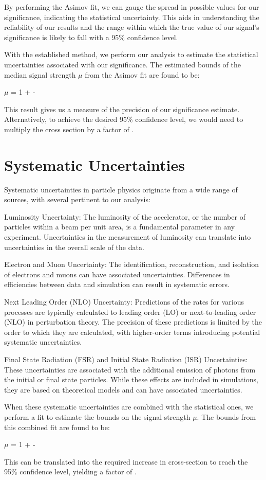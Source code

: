 By performing the Asimov fit, we can gauge the spread in possible values for our significance, indicating the
statistical uncertainty. This aids in understanding the reliability of our results and the range within which the true
value of our signal's significance is likely to fall with a 95\% confidence level.

With the established method, we perform our analysis to estimate the statistical uncertainties associated with our
significance. The estimated bounds of the median signal strength $\mu$ from the Asimov fit are found to be:

$\mu$ = 1 +  - 

This result gives us a measure of the precision of our significance estimate.
Alternatively, to achieve the desired 95\% confidence level, we would need to multiply the cross section by a factor of
.

\section{Systematic Uncertainties}

Systematic uncertainties in particle physics originate from a wide range of sources, with several pertinent to our
analysis:

Luminosity Uncertainty: The luminosity of the accelerator, or the number of particles within a beam per unit area, is a
fundamental parameter in any experiment. Uncertainties in the measurement of luminosity can translate into uncertainties
in the overall scale of the data.

Electron and Muon Uncertainty: The identification, reconstruction, and isolation of electrons and muons can have
associated uncertainties. Differences in efficiencies between data and simulation can result in systematic errors.

Next Leading Order (NLO) Uncertainty: Predictions of the rates for various processes are typically calculated to leading
order (LO) or next-to-leading order (NLO) in perturbation theory. The precision of these predictions is limited by the
order to which they are calculated, with higher-order terms introducing potential systematic uncertainties.

Final State Radiation (FSR) and Initial State Radiation (ISR) Uncertainties: These uncertainties are associated with the
additional emission of photons from the initial or final state particles. While these effects are included in
simulations, they are based on theoretical models and can have associated uncertainties.

When these systematic uncertainties are combined with the statistical ones, we perform a fit to estimate the bounds on
the signal strength $\mu$. The bounds from this combined fit are found to be:

$\mu$ = 1 +  - 

This can be translated into the required increase in cross-section to reach the 95\% confidence
level, yielding a factor of .